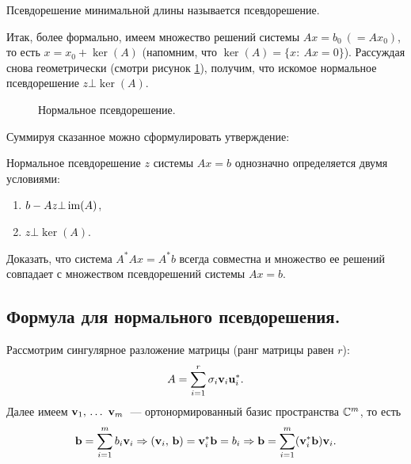 \begin{definition}
    Псевдорешение минимальной длины называется  псевдорешение.
\end{definition}

Итак, более формально, имеем множество решений системы $Ax=b_0\ (=Ax_0)$, то есть $x = x_0+\ker(A)$ (напомним, что $\ker(A)=\{x:\ Ax=0\}$).
Рассуждая снова геометрически (смотри рисунок \ref{fig:ker}), получим, что искомое нормальное псевдорешение $z\bot \ker(A)$.

\begin{figure}[!ht]
    \centering
    
    \caption{Нормальное псевдорешение.}
    \label{fig:ker}
\end{figure}

Суммируя сказанное можно сформулировать утверждение:
\begin{claim}
    \label{lect6:cl:1}
    Нормальное псевдорешение $z$ системы $Ax=b$ однозначно определяется двумя условиями:
    \begin{enumerate}[label=(\arabic*)]
        \item $b-Az\bot \operatorname{im}(A)$,
        \item $z\bot \ker(A)$.
    \end{enumerate}
\end{claim}

\begin{task}
    Доказать, что система $A^*Ax=A^*b$ всегда совместна и множество ее решений совпадает с множеством псевдорешений системы $Ax=b$.
\end{task}

\subsection{Формула для нормального псевдорешения.}

Рассмотрим сингулярное разложение матрицы (ранг матрицы равен $r$):
\[
    A=\sum_{i=1}^r \sigma_i\mathbf{v}_i\mathbf{u}_i^*.
\]
Далее имеем $\mathbf{v}_1,\,\ldots\,\, \mathbf{v}_m$~--- ортонормированный базис пространства $\mathbb{C}^m$, то есть 
\[
    \mathbf{b} = \sum_{i=1}^m b_i\mathbf{v}_i\Rightarrow (\mathbf{v}_i,\, \mathbf{b})=\mathbf{v}_i^*\mathbf{b}=b_i\Rightarrow \mathbf{b}=\sum_{i=1}^m(\mathbf{v}_i^*\mathbf{b})\mathbf{v}_i.
\]

